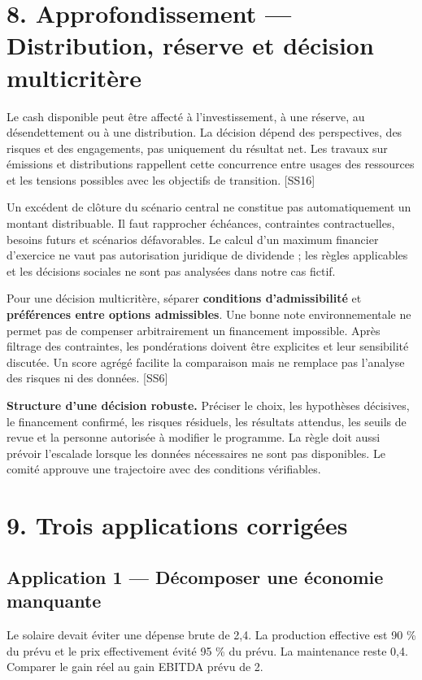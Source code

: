 \documentclass[12pt,a4paper]{article}
\begin{document}
\section*{8. Approfondissement --- Distribution, réserve et décision multicritère}
Le cash disponible peut être affecté à l’investissement, à une réserve, au désendettement ou à une distribution. La décision dépend des perspectives, des risques et des engagements, pas uniquement du résultat net. Les travaux sur émissions et distributions rappellent cette concurrence entre usages des ressources et les tensions possibles avec les objectifs de transition. [SS16]


Un excédent de clôture du scénario central ne constitue pas automatiquement un montant distribuable. Il faut rapprocher échéances, contraintes contractuelles, besoins futurs et scénarios défavorables. Le calcul d’un maximum financier d’exercice ne vaut pas autorisation juridique de dividende ; les règles applicables et les décisions sociales ne sont pas analysées dans notre cas fictif.


Pour une décision multicritère, séparer \textbf{conditions d’admissibilité} et \textbf{préférences entre options admissibles}. Une bonne note environnementale ne permet pas de compenser arbitrairement un financement impossible. Après filtrage des contraintes, les pondérations doivent être explicites et leur sensibilité discutée. Un score agrégé facilite la comparaison mais ne remplace pas l’analyse des risques ni des données. [SS6]


\textbf{Structure d’une décision robuste.} Préciser le choix, les hypothèses décisives, le financement confirmé, les risques résiduels, les résultats attendus, les seuils de revue et la personne autorisée à modifier le programme. La règle doit aussi prévoir l’escalade lorsque les données nécessaires ne sont pas disponibles. Le comité approuve une trajectoire avec des conditions vérifiables.

\section*{9. Trois applications corrigées}

\subsection*{Application 1 --- Décomposer une économie manquante}
Le solaire devait éviter une dépense brute de 2,4. La production effective est 90 \% du prévu et le prix effectivement évité 95 \% du prévu. La maintenance reste 0,4. Comparer le gain réel au gain EBITDA prévu de 2.
\end{document}

